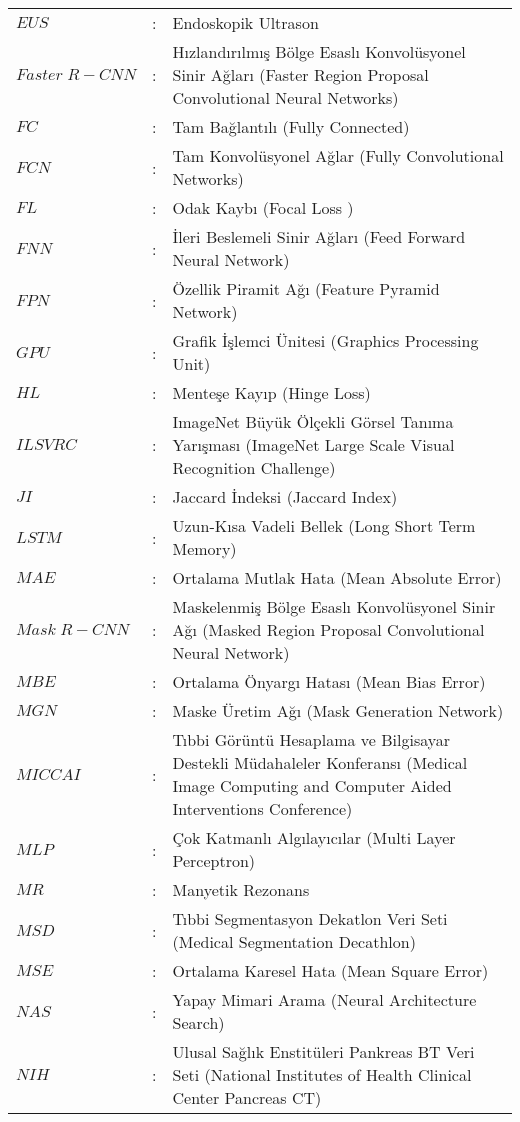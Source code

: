 \begin{longtable}{p{3.5cm}p{0.2cm}p{9.5cm}}
    $EUS $ & : &  Endoskopik Ultrason \\
    $Faster \; R-CNN $ & : &  Hızlandırılmış Bölge Esaslı Konvolüsyonel Sinir Ağları (Faster Region     Proposal Convolutional Neural Networks) \\
    $FC $ & : &  Tam Bağlantılı (Fully Connected) \\
    $FCN $ & : &  Tam Konvolüsyonel Ağlar (Fully Convolutional Networks) \\
    $FL $ & : &  Odak Kaybı  (Focal Loss ) \\
    $FNN $ & : &  İleri Beslemeli Sinir Ağları (Feed Forward Neural Network) \\
    $FPN $ & : &  Özellik Piramit Ağı (Feature Pyramid Network) \\
    $GPU $ & : &  Grafik İşlemci Ünitesi (Graphics Processing Unit) \\
    $HL $ & : &  Menteşe Kayıp (Hinge Loss) \\
    $ILSVRC $ & : &  ImageNet Büyük Ölçekli Görsel Tanıma Yarışması (ImageNet Large Scale Visual     Recognition Challenge) \\
    $JI $ & : &  Jaccard İndeksi (Jaccard Index) \\
    $LSTM $ & : &  Uzun-Kısa Vadeli Bellek (Long Short Term Memory) \\
    $MAE $ & : &  Ortalama Mutlak Hata (Mean Absolute Error) \\
    $Mask \; R-CNN $ & : &  Maskelenmiş Bölge Esaslı Konvolüsyonel Sinir Ağı (Masked Region Proposal     Convolutional Neural Network) \\
    $MBE $ & : &  Ortalama Önyargı Hatası (Mean Bias Error) \\
    $MGN $ & : &  Maske Üretim Ağı (Mask Generation Network) \\
    $MICCAI $ & : &  Tıbbi Görüntü Hesaplama ve Bilgisayar Destekli Müdahaleler Konferansı (Medical     Image Computing and Computer Aided Interventions Conference) \\
    $MLP $ & : &  Çok Katmanlı Algılayıcılar (Multi Layer Perceptron) \\
    $MR $ & : &  Manyetik Rezonans \\
    $MSD $ & : &  Tıbbi Segmentasyon Dekatlon Veri Seti (Medical Segmentation Decathlon) \\
    $MSE $ & : &  Ortalama Karesel Hata (Mean Square Error) \\
    $NAS $ & : &  Yapay Mimari Arama (Neural Architecture Search) \\
    $NIH $ & : &  Ulusal Sağlık Enstitüleri Pankreas BT Veri Seti (National Institutes of Health     Clinical Center Pancreas CT) \\

\end{longtable}
